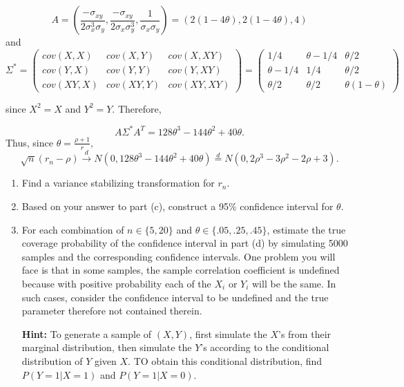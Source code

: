 \documentclass[12pt,]{article}
\begin{document}
\[A = \left(\frac{-\sigma_{xy}}{2\sigma_x^3\sigma_y}, \frac{-\sigma_{xy}}{2\sigma_x\sigma_y^3}, \frac{1}{\sigma_x\sigma_y}\right) =\left(2(1-4\theta), 2(1-4\theta), 4\right)\]
and \[\Sigma^{*} = \begin{pmatrix}
cov(X,X) & cov(X,Y) & cov(X,XY)\\
cov(Y,X) & cov(Y,Y) & cov(Y,XY)\\
cov(XY,X) & cov(XY,Y) & cov(XY,XY)
\end{pmatrix} =\begin{pmatrix}
1/4 & \theta - 1/4 & \theta/2\\
\theta - 1/4 & 1/4 & \theta/2\\
\theta/2 & \theta/2 & \theta(1-\theta)
\end{pmatrix}\]

since \(X^2 = X\) and \(Y^2=Y\). Therefore,

\[A\Sigma^{*}A^T = 128\theta^3-144\theta^2+40\theta.\] Thus, since
\(\theta = \frac{\rho+1}{r},\)
\[\sqrt{n}(r_n-\rho)\overset{d}\rightarrow N(0,128\theta^3-144\theta^2+40\theta)\overset{d}=N(0, 2\rho^3-3\rho^2-2\rho+3).\]

\begin{enumerate}
\def\labelenumi{(\alph{enumi})}
\setcounter{enumi}{2}
\item
  Find a variance stabilizing transformation for \(r_n\).
\item
  Based on your answer to part (c), construct a 95\% confidence interval
  for \(\theta\).
\item
  For each combination of \(n\in\{5,20\}\) and
  \(\theta \in \{.05, .25, .45\}\), estimate the true coverage
  probability of the confidence interval in part (d) by simulating 5000
  samples and the corresponding confidence intervals. One problem you
  will face is that in some samples, the sample correlation coefficient
  is undefined because with positive probability each of the \(X_i\) or
  \(Y_i\) will be the same. In such cases, consider the confidence
  interval to be undefined and the true parameter therefore not
  contained therein.

  \textbf{Hint:} To generate a sample of \((X,Y)\), first simulate the
  \(X\)'s from their marginal distribution, then simulate the \(Y\)'s
  according to the conditional distribution of \(Y\) given \(X\). TO
  obtain this conditional distribution, find \(P(Y=1|X=1)\) and
  \(P(Y=1|X=0).\)
\end{enumerate}
\end{document}
